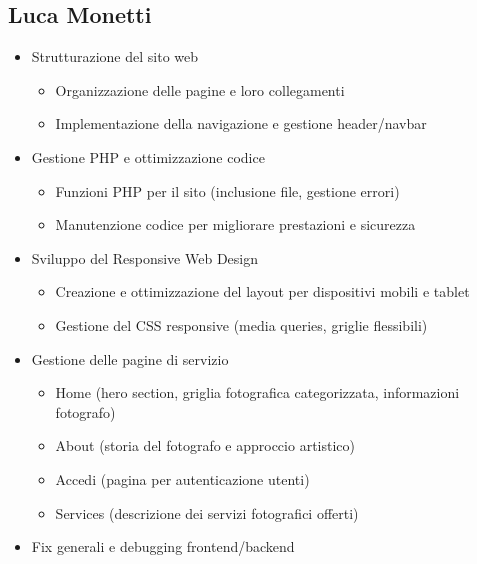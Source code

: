 \subsection{Luca Monetti}
\begin{itemize}
    \item Strutturazione del sito web
    \begin{itemize}
        \item Organizzazione delle pagine e loro collegamenti
        \item Implementazione della navigazione e gestione header/navbar
    \end{itemize}
    \item Gestione PHP e ottimizzazione codice
    \begin{itemize}
        \item Funzioni PHP per il sito (inclusione file, gestione errori)
        \item Manutenzione codice per migliorare prestazioni e sicurezza
    \end{itemize}
    \item Sviluppo del Responsive Web Design
    \begin{itemize}
        \item Creazione e ottimizzazione del layout per dispositivi mobili e tablet
        \item Gestione del CSS responsive (media queries, griglie flessibili)
    \end{itemize}
    \item Gestione delle pagine di servizio
    \begin{itemize}
        \item Home (hero section, griglia fotografica categorizzata, informazioni fotografo)
        \item About (storia del fotografo e approccio artistico)
        \item Accedi (pagina per autenticazione utenti)
        \item Services (descrizione dei servizi fotografici offerti)
    \end{itemize}
    \item Fix generali e debugging frontend/backend
\end{itemize}

